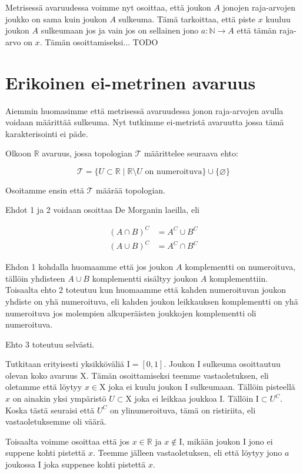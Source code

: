 \documentclass[12pt,a4paper,leqno]{report}
\newcommand{\R}{\mathbb{R}}
\newcommand{\N}{\mathbb{N}}
\newcommand{\X}{\mathrm{X}}
\newcommand{\T}{\mathcal{T}}
\newcommand{\I}{\mathrm{I}}
\theoremstyle{plain}
\theoremstyle{definition}
\theoremstyle{remark}
\begin{document}
Metrisessä avaruudessa voimme nyt osoittaa, että joukon $A$ jonojen raja-arvojen joukko on sama kuin joukon $A$ sulkeuma. Tämä tarkoittaa, että piste $x$ kuuluu joukon $A$ sulkeumaan jos ja vain jos on sellainen jono $a : \N \to A$ että tämän raja-arvo on $x$. Tämän osoittamiseksi... TODO

\chapter{Erikoinen ei-metrinen avaruus}
Aiemmin huomasimme että metrisessä avaruudessa jonon raja-arvojen avulla voidaan määrittää sulkeuma. Nyt tutkimme ei-metristä avaruutta jossa tämä karakterisointi ei päde.

Olkoon $\R$ avaruus, jossa topologian $\T$ määrittelee seuraava ehto:

\begin{equation}
\T = \{U \subset \R \mid \R \setminus U \text{ on numeroituva} \} \cup \{ \varnothing \}
\end{equation}

Osoitamme ensin että $\T$ määrää topologian.

Ehdot 1 ja 2 voidaan osoittaa De Morganin laeilla, eli 

\begin{align}
(A \cap B)^C &= A^C \cup B^C \\
(A \cup B)^C &= A^C \cap B^C
\end{align}

Ehdon 1 kohdalla huomaamme että jos joukon $A$ komplementti on numeroituva, tällöin yhdisteen $A \cup B$ komplementti sisältyy joukon $A$ komplementtiin. Toisaalta ehto 2 toteutuu kun huomaamme että kahden numeroituvan joukon yhdiste on yhä numeroituva, eli kahden joukon leikkauksen komplementti on yhä numeroituva jos molempien alkuperäisten joukkojen komplementti oli numeroituva.

Ehto 3 toteutuu selvästi.

Tutkitaan erityisesti yksikköväliä $\I = [0,1]$. Joukon $\I$ sulkeuma osoittautuu olevan koko avaruus $\X$. Tämän osoittamiseksi teemme vastaoletuksen, eli oletamme että löytyy $x \in \X$ joka ei kuulu joukon $\I$ sulkeumaan. Tällöin pisteellä $x$ on ainakin yksi ympäristö $U \subset \X$ joka ei leikkaa joukkoa $\I$. Tällöin $\I \subset U^C$. Koska tästä seuraisi että $U^C$ on ylinumeroituva, tämä on ristiriita, eli vastaoletuksemme oli väärä.

Toisaalta voimme osoittaa että jos $x \in \R$ ja $x \not\in \I$, mikään joukon $\I$ jono ei suppene kohti pistettä $x$. Teemme jälleen vastaoletuksen, eli että löytyy jono $a$ joukossa $\I$ joka suppenee kohti pistettä $x$.
\end{document}
